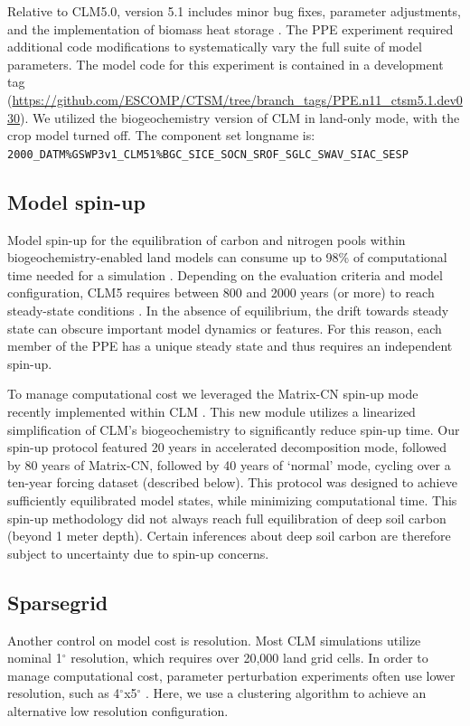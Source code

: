 \documentclass[draft]{agujournal2019}
\begin{document}
Relative to CLM5.0, version 5.1 includes minor bug fixes, parameter adjustments, and the implementation of biomass heat storage \cite{swenson2019}. The PPE experiment required additional code modifications to systematically vary the full suite of model parameters. The model code for this experiment is contained in a development tag (\url{https://github.com/ESCOMP/CTSM/tree/branch_tags/PPE.n11_ctsm5.1.dev030}). We utilized the biogeochemistry version of CLM in land-only mode, with the crop model turned off. The component set longname is: \\ \texttt{2000\_DATM\%GSWP3v1\_CLM51\%BGC\_SICE\_SOCN\_SROF\_SGLC\_SWAV\_SIAC\_SESP}

\subsection{Model spin-up}
\label{sect:mcn}
Model spin-up for the equilibration of carbon and nitrogen pools within biogeochemistry-enabled land models can consume up to 98\% of computational time needed for a simulation \cite{sun2023}. Depending on the evaluation criteria and model configuration, CLM5 requires between 800 and 2000 years (or more) to reach steady-state conditions \cite{lawrence2019}. In the absence of equilibrium, the drift towards steady state can obscure important model dynamics or features. For this reason, each member of the PPE has a unique steady state and thus requires an independent spin-up.

To manage computational cost we leveraged the Matrix-CN spin-up mode recently implemented within CLM \cite{lu2020}. This new module utilizes a linearized simplification of CLM's biogeochemistry to significantly reduce spin-up time. Our spin-up protocol featured 20 years in accelerated decomposition mode, followed by 80 years of Matrix-CN, followed by 40 years of `normal' mode, cycling over a ten-year forcing dataset (described below). This protocol was designed to achieve sufficiently equilibrated model states, while minimizing computational time. This spin-up methodology did not always reach full equilibration of deep soil carbon (beyond 1 meter depth). Certain inferences about deep soil carbon are therefore subject to uncertainty due to spin-up concerns.

\subsection{Sparsegrid}
\label{sect:sg}
Another control on model cost is resolution. Most CLM simulations utilize nominal 1$^\circ$ resolution, which requires over 20,000 land grid cells. In order to manage computational cost, parameter perturbation experiments often use lower resolution, such as 4$^\circ$x5$^\circ$ \cite{dagon2020}. Here, we use a clustering algorithm to achieve an alternative low resolution configuration.
\end{document}
